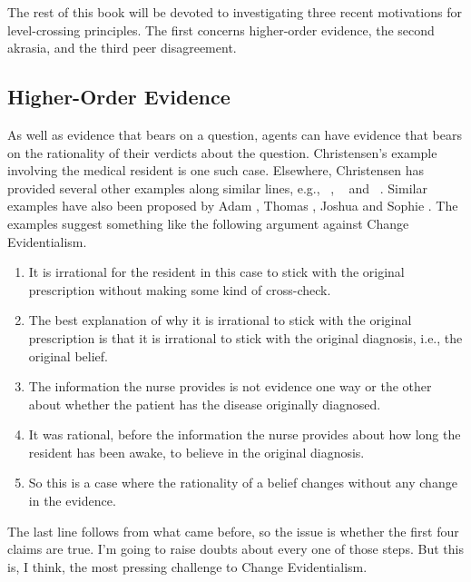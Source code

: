The rest of this book will be devoted to investigating three recent motivations for level-crossing principles. The first concerns higher-order evidence, the second akrasia, and the third peer disagreement.

\subsection{Higher-Order Evidence}
\label{higher-orderevidence}

As well as evidence that bears on a question, agents can have evidence that bears on the rationality of their verdicts about the question. Christensen's example involving the medical resident is one such case. Elsewhere, Christensen has provided several other examples along similar lines, e.g., ~\citep[8]{Christensen2007a}, ~\citep[126]{Christensen2010b} and ~\citep[5-6]{Christensen2011}. Similar examples have also been proposed by Adam \citet{Elga2008}, Thomas \citet[140]{Kelly2010}, Joshua \citet[443-4]{Schechter2013} and Sophie \citet[719]{Horowitz2014}. The examples suggest something like the following argument against Change Evidentialism.

\begin{enumerate}
\item{} It is irrational for the resident in this case to stick with the original prescription without making some kind of cross-check.

\item{} The best explanation of why it is irrational to stick with the original prescription is that it is irrational to stick with the original diagnosis, i.e., the original belief.

\item{} The information the nurse provides is not evidence one way or the other about whether the patient has the disease originally diagnosed.

\item{} It was rational, before the information the nurse provides about how long the resident has been awake, to believe in the original diagnosis.

\item{} So this is a case where the rationality of a belief changes without any change in the evidence.

\end{enumerate}
The last line follows from what came before, so the issue is whether the first four claims are true. I'm going to raise doubts about every one of those steps. But this is, I think, the most pressing challenge to Change Evidentialism.

